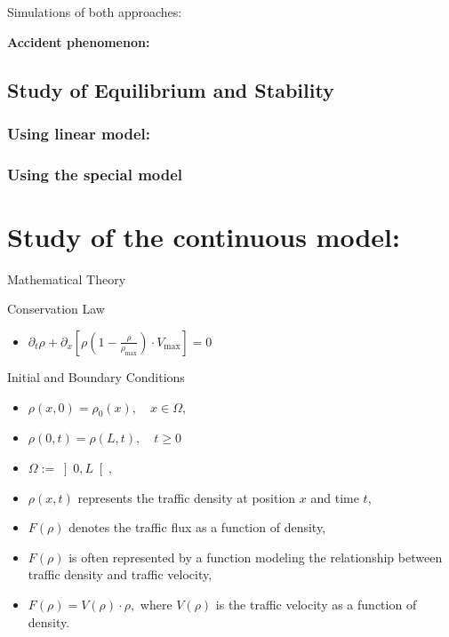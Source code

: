 \documentclass{beamer}
\begin{document}
\begin{frame}{Simulations of both approaches:}
\begin{center}
    \textbf{Accident phenomenon:}
\end{center}
\end{frame}
\subsection{Study of Equilibrium and Stability}
\subsubsection{Using linear model:}
\subsubsection{Using the special model}
\section{Study of the continuous model:}
\begin{frame}{Mathematical Theory}
	\begin{alertblock}{Conservation Law}
		\begin{itemize}
			\item $\partial_t\rho + \partial_x\left[ \rho\left( 1-\frac{\rho}{\rho_{\text{max}}}\right) \cdot V_{\text{max}}\right] = 0 $
		\end{itemize}
	\end{alertblock}
	\begin{block}{Initial and Boundary Conditions}
		\begin{itemize}
			\item $\rho(x,0) = \rho_0(x), \quad x \in \Omega,$
			\item $\rho(0,t) = \rho(L,t), \quad t \geq 0$
			\item $\Omega := \left] 0,L\right[, $
			\item $\rho(x,t)$ represents the traffic density at position $x$ and time $t$, 
			\item $F(\rho)$ denotes the traffic flux as a function of density,
			\item $F(\rho)$ is often represented by a function modeling the relationship between traffic density and traffic velocity,
			\item $F(\rho) = V(\rho) \cdot \rho,$ where $V(\rho)$ is the traffic velocity as a function of density.
		\end{itemize}
	\end{block}
\end{frame}
\end{document}
